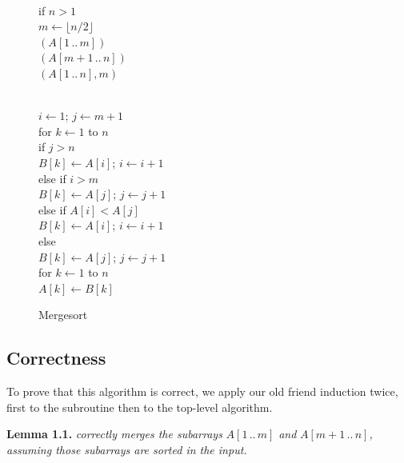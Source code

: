 \begin{figure}[ht]
\centering
\begin{minipage}[c]{0.57\linewidth}
\begin{pseudocode}
\\
if $n > 1$\\
\Indent $m \gets \lfloor n/2\rfloor$\\
\Indent {}$(A[1\,..\,m])$ \\
\Indent {}$(A[m+1\,..\,n])$ \\
\Indent {}$(A[1\,..\,n], m)$
\end{pseudocode}
\end{minipage}\hfill
\begin{minipage}[c]{0.42\linewidth}
\begin{pseudocode}
\\
$i \gets 1$; $j \gets m+1$\\
for $k \gets 1$ to $n$\\
\Indent if $j > n$\\
\Indent\Indent $B[k] \gets A[i]$; $i \gets i+1$\\
\Indent else if $i > m$\\
\Indent\Indent $B[k] \gets A[j]$; $j \gets j+1$\\
\Indent else if $A[i] < A[j]$\\
\Indent\Indent $B[k] \gets A[i]$; $i \gets i+1$\\
\Indent else\\
\Indent\Indent $B[k] \gets A[j]$; $j \gets j+1$\\
for $k \gets 1$ to $n$\\
\Indent $A[k] \gets B[k]$
\end{pseudocode}
\end{minipage}
\caption{Mergesort}
\label{fig:1.6}
\end{figure}
\subsection{Correctness}
To prove that this algorithm is correct, we apply our old friend induction twice, first to the  subroutine then to the top-level  algorithm.

\noindent\textbf{Lemma 1.1.} \textsl{ correctly merges the subarrays} $A[1\,..\,m]$ \textsl{and} $A[m + 1\,..\,n]$\textsl{, assuming those subarrays are sorted in the input.}

